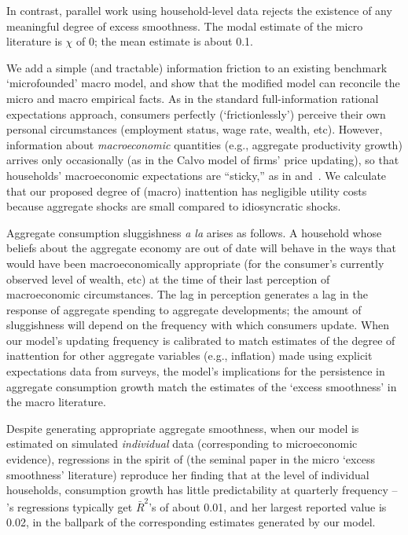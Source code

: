 \documentclass[titlepage]{./econtex}
\begin{document}
In contrast, parallel work using household-level data rejects the existence of any meaningful degree of excess smoothness.  The modal estimate of the micro literature is $\chi$ of 0; the mean estimate is about 0.1. 


We add a simple (and tractable) information friction to an existing benchmark `microfounded' macro model, and show that the modified model can reconcile the micro and macro empirical facts. As in the standard full-information rational expectations approach, consumers perfectly (`frictionlessly') perceive their own personal circumstances (employment status, wage rate, wealth, etc). However, information about \textit{macroeconomic} quantities (e.g., aggregate productivity growth) arrives only occasionally (as in the Calvo model of firms' price updating), so that households' macroeconomic expectations are ``sticky,'' as in \cite{mrSlumps} and~\cite{carroll:epidemicinflQJE}. We calculate that our proposed degree of (macro) inattention has negligible utility costs because aggregate shocks are small compared to idiosyncratic shocks.

Aggregate consumption sluggishness \textit{a la} \cite{cdSmooth} arises as follows.  A household whose beliefs about the aggregate economy are out of date will behave in the ways that would have been macroeconomically appropriate (for the consumer's currently observed level of wealth, etc) at the time of their last perception of macroeconomic circumstances.  The lag in perception generates a lag in the response of aggregate spending to aggregate developments; the amount of sluggishness will depend on the frequency with which consumers update.  When our model's updating frequency is calibrated to match estimates of the degree of inattention for other aggregate variables (e.g., inflation) made using explicit expectations data from surveys, the model's implications for the persistence in aggregate consumption growth match the estimates of the `excess smoothness' in the macro literature. 


Despite generating appropriate aggregate smoothness, when our model is estimated on simulated \emph{individual} data (corresponding to microeconomic evidence), regressions in the spirit of  \cite{dynanHabits} (the seminal paper in the micro `excess smoothness' literature) reproduce her finding that at the level of individual households, consumption growth has little predictability at quarterly frequency -- \cite{dynanHabits}'s regressions typically get $\bar{R}^{2}$'s of about 0.01, and her largest reported value is 0.02, in the ballpark of the corresponding estimates generated by our model.
 
\end{document}
